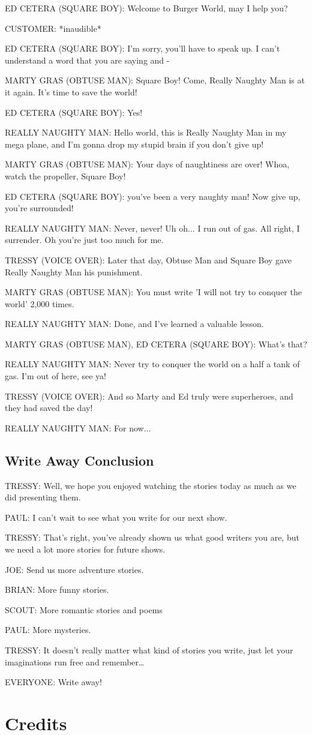 ED CETERA (SQUARE BOY):
Welcome to Burger World, may I help you?

CUSTOMER:
*inaudible*

ED CETERA (SQUARE BOY):
I'm sorry, you'll have to speak up.
I can't understand a word that you are saying and -

MARTY GRAS (OBTUSE MAN):
Square Boy!
Come, Really Naughty Man is at it again.
It's time to save the world!

ED CETERA (SQUARE BOY):
Yes!

REALLY NAUGHTY MAN:
Hello world, this is Really Naughty Man in my mega plane, and I'm gonna drop my stupid brain if you don't give up!

MARTY GRAS (OBTUSE MAN):
Your days of naughtiness are over!
Whoa, watch the propeller, Square Boy!

ED CETERA (SQUARE BOY):
you've been a very naughty man!
Now give up, you're surrounded!

REALLY NAUGHTY MAN:
Never, never!
Uh oh... I run out of gas.
All right, I surrender.
Oh you're just too much for me.

TRESSY (VOICE OVER):
Later that day, Obtuse Man and Square Boy gave Really Naughty Man his punishment.

MARTY GRAS (OBTUSE MAN):
You must write 'I will not try to conquer the world' 2,000 times.

REALLY NAUGHTY MAN:
Done, and I've learned a valuable lesson.

MARTY GRAS (OBTUSE MAN), ED CETERA (SQUARE BOY):
What's that?

REALLY NAUGHTY MAN:
Never try to conquer the world on a half a tank of gas.
I'm out of here, see ya!

TRESSY (VOICE OVER):
And so Marty and Ed truly were superheroes, and they had saved the day!

REALLY NAUGHTY MAN:
For now...

\subsection{Write Away Conclusion}

TRESSY:
Well, we hope you enjoyed watching the stories today as much as we did presenting them.

PAUL:
I can't wait to see what you write for our next show.

TRESSY:
That's right, you've already shown us what good writers you are, but we need a lot more stories for future shows.

JOE:
Send us more adventure stories.

BRIAN:
More funny stories.

SCOUT:
More romantic stories and poems

PAUL:
More mysteries.

TRESSY:
It doesn't really matter what kind of stories you write, just let your imaginations run free and remember\dots

EVERYONE:
Write away!

\section{Credits}
